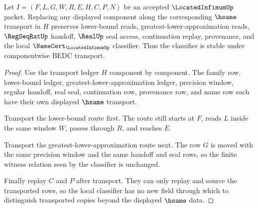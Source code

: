\begin{theorem}
\label{thm:located-infimum-classifier-stability}
Let $I=(F,L,G,W,R,E,H,C,P,N)$ be an accepted $\LocatedInfimumUp$ packet. Replacing any displayed component along the corresponding $\hsame$ transport in $H$ preserves lower-bound reads, greatest-lower-approximation reads, $\RegSeqRatUp$ handoff, $\RealUp$ seal access, continuation replay, provenance, and the local $\NameCert_{\LocatedInfimumUp}$ classifier. Thus the classifier is stable under componentwise BEDC transport.
\end{theorem}
\begin{proof}
Use the transport ledger $H$ component by component. The family row, lower-bound ledger, greatest-lower-approximation ledger, precision window, regular handoff, real seal, continuation row, provenance row, and name row each have their own displayed $\hsame$ transport.

Transport the lower-bound route first. The route still starts at $F$, reads $L$ inside the same window $W$, passes through $R$, and reaches $E$.

Transport the greatest-lower-approximation route next. The row $G$ is moved with the same precision window and the same handoff and seal rows, so the finite witness relation seen by the classifier is unchanged.

Finally replay $C$ and $P$ after transport. They can only replay and source the transported rows, so the local classifier has no new field through which to distinguish transported copies beyond the displayed $\hsame$ data.
\end{proof}

